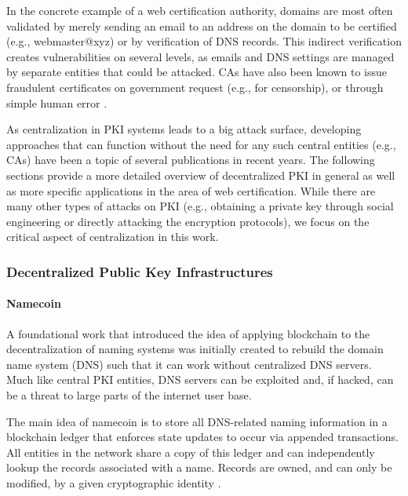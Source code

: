 In the concrete example of a web certification authority, domains are most often validated by merely sending an email to an address on the domain to be certified (e.g., webmaster@xyz) or by verification of DNS records. This indirect verification creates vulnerabilities on several levels, as emails and DNS settings are managed by separate entities that could be attacked. CAs have also been known to issue fraudulent certificates on government request (e.g., for censorship), or through simple human error \cite{zusman_criminal_2008, zohar_blockchain-based_2019}.

As centralization in PKI systems leads to a big attack surface, developing approaches that can function without the need for any such central entities (e.g., CAs) have been a topic of several publications in recent years. The following sections provide a more detailed overview of decentralized PKI in general as well as more specific applications in the area of web certification. While there are many other types of attacks on PKI (e.g., obtaining a private key through social engineering or directly attacking the encryption protocols), we focus on the critical aspect of centralization in this work.


\subsubsection{Decentralized Public Key Infrastructures}

\paragraph{Namecoin}

A foundational work that introduced the idea of applying blockchain to the decentralization of naming systems was initially created to rebuild the domain name system (DNS) such that it can work without centralized DNS servers. Much like central PKI entities, DNS servers can be exploited and, if hacked, can be a threat to large parts of the internet user base.

The main idea of namecoin is to store all DNS-related naming information in a blockchain ledger that enforces state updates to occur via appended transactions. All entities in the network share a copy of this ledger and can independently lookup the records associated with a name. Records are owned, and can only be modified, by a given cryptographic identity \cite{noauthor_namecoin_nodate, ali_blockstack:_2016}.

